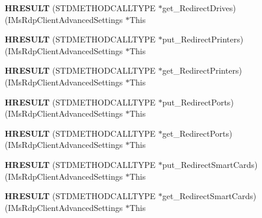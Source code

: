 \begin{DoxyCompactItemize}
{\bfseries H\+R\+E\+S\+U\+LT} (S\+T\+D\+M\+E\+T\+H\+O\+D\+C\+A\+L\+L\+T\+Y\+PE $\ast$get\+\_\+\+Redirect\+Drives)(I\+Ms\+Rdp\+Client\+Advanced\+Settings $\ast$This
\item 
\mbox{\label{struct_i_ms_rdp_client_advanced_settings_vtbl_ad2efb7113b12f7d6286a6929fc215a7c}} 
{\bfseries H\+R\+E\+S\+U\+LT} (S\+T\+D\+M\+E\+T\+H\+O\+D\+C\+A\+L\+L\+T\+Y\+PE $\ast$put\+\_\+\+Redirect\+Printers)(I\+Ms\+Rdp\+Client\+Advanced\+Settings $\ast$This
\item 
\mbox{\label{struct_i_ms_rdp_client_advanced_settings_vtbl_a9eaa42ca7841b8f1c7b6b87bb11f09b4}} 
{\bfseries H\+R\+E\+S\+U\+LT} (S\+T\+D\+M\+E\+T\+H\+O\+D\+C\+A\+L\+L\+T\+Y\+PE $\ast$get\+\_\+\+Redirect\+Printers)(I\+Ms\+Rdp\+Client\+Advanced\+Settings $\ast$This
\item 
\mbox{\label{struct_i_ms_rdp_client_advanced_settings_vtbl_ad39f1b8027f765ebf593fc7080b888e8}} 
{\bfseries H\+R\+E\+S\+U\+LT} (S\+T\+D\+M\+E\+T\+H\+O\+D\+C\+A\+L\+L\+T\+Y\+PE $\ast$put\+\_\+\+Redirect\+Ports)(I\+Ms\+Rdp\+Client\+Advanced\+Settings $\ast$This
\item 
\mbox{\label{struct_i_ms_rdp_client_advanced_settings_vtbl_af8621759860d29ccff103e5add94a72a}} 
{\bfseries H\+R\+E\+S\+U\+LT} (S\+T\+D\+M\+E\+T\+H\+O\+D\+C\+A\+L\+L\+T\+Y\+PE $\ast$get\+\_\+\+Redirect\+Ports)(I\+Ms\+Rdp\+Client\+Advanced\+Settings $\ast$This
\item 
\mbox{\label{struct_i_ms_rdp_client_advanced_settings_vtbl_a381d056665432e4d7b1f86b76360be81}} 
{\bfseries H\+R\+E\+S\+U\+LT} (S\+T\+D\+M\+E\+T\+H\+O\+D\+C\+A\+L\+L\+T\+Y\+PE $\ast$put\+\_\+\+Redirect\+Smart\+Cards)(I\+Ms\+Rdp\+Client\+Advanced\+Settings $\ast$This
\item 
\mbox{\label{struct_i_ms_rdp_client_advanced_settings_vtbl_ac68722caa3725f2101d1edfa09f9260d}} 
{\bfseries H\+R\+E\+S\+U\+LT} (S\+T\+D\+M\+E\+T\+H\+O\+D\+C\+A\+L\+L\+T\+Y\+PE $\ast$get\+\_\+\+Redirect\+Smart\+Cards)(I\+Ms\+Rdp\+Client\+Advanced\+Settings $\ast$This
\item 

\end{DoxyCompactItemize}
